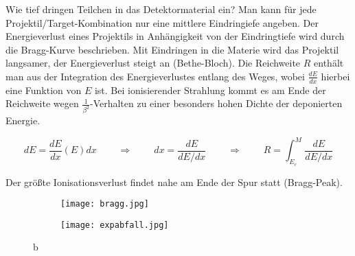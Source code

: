 Wie tief dringen Teilchen in das Detektormaterial ein? Man kann für jede
Projektil/Target-Kombination nur eine mittlere Eindringiefe angeben. Der Energieverlust eines
Projektils in Anhängigkeit von der Eindringtiefe wird durch die Bragg-Kurve beschrieben. Mit
Eindringen in die Materie wird das Projektil langsamer, der Energieverlust steigt an
(Bethe-Bloch). Die Reichweite $R$ enthält man aus der Integration des Energieverlustes entlang des
Weges, wobei $\frac{dE}{dx}$ hierbei eine Funktion von $E$ ist. Bei ionisierender Strahlung kommt es
am Ende der Reichweite wegen $\frac{1}{\beta^2}$-Verhalten zu einer besonders hohen Dichte der
deponierten Energie.

\[dE= \frac{dE}{dx}(E)dx~~~~~~~~~~\Rightarrow~~~~~~~~~~dx
=\frac{dE}{dE/dx}~~~~~~~~~~\Rightarrow~~~~~~~~~~ R=\int_{E_c}^{M} \frac{dE}{dE/dx}  \]

Der größte Ionisationsverlust findet nahe am Ende der Spur statt (Bragg-Peak).




% 
% 

\begin{figure}[htbp]
	\begin{minipage}[b]{0.5\textwidth}
		\begin{figure}[H]
		\centering
		\texttt{[image: bragg.jpg]}
		\end{figure}
	\end{minipage}
	\hfill
	\begin{minipage}[b]{0.5\textwidth}
		\begin{figure}[H]
		\centering
		\texttt{[image: expabfall.jpg]}
		\end{figure}
	\end{minipage}
	\caption{b}
	\label{rekristall} 
\end{figure}